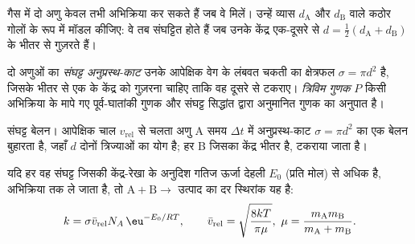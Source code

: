 गैस में दो अणु केवल तभी अभिक्रिया कर सकते हैं जब वे मिलें। उन्हें व्यास $d_{\mathrm A}$ और $d_{\mathrm B}$
वाले कठोर गोलों के रूप में मॉडल कीजिए: वे तब संघट्टित होते हैं जब उनके केंद्र एक-दूसरे से $d =
\frac12(d_{\mathrm A} + d_{\mathrm B})$ के भीतर से गुज़रते हैं।

\begin{definition}[संघट्ट अनुप्रस्थ-काट, त्रिविम गुणक]\label{def:b3:rate-theories:collision}
दो अणुओं का \emph{संघट्ट अनुप्रस्थ-काट}
उनके आपेक्षिक वेग के लंबवत चकती का क्षेत्रफल $\sigma = \pi d^2$ है,
जिसके भीतर से एक के केंद्र को गुज़रना चाहिए ताकि वह दूसरे से टकराए।
\emph{त्रिविम गुणक} $P$ किसी अभिक्रिया के मापे गए
पूर्व-घातांकी गुणक और संघट्ट सिद्धांत द्वारा अनुमानित गुणक का अनुपात है।
\end{definition}

\begin{omfigure}

{\small संघट्ट बेलन। आपेक्षिक चाल $v_{\mathrm{rel}}$ से चलता अणु A
समय $\Delta t$ में अनुप्रस्थ-काट $\sigma = \pi d^2$ का एक बेलन बुहारता है, जहाँ $d$ दोनों
त्रिज्याओं का योग है; हर B जिसका केंद्र भीतर है, टकराया जाता है।}
\end{omfigure}

\begin{theorem}[संघट्ट-सिद्धांत दर स्थिरांक]\label{thm:b3:rate-theories:collision}
यदि हर वह संघट्ट जिसकी केंद्र-रेखा के अनुदिश गतिज ऊर्जा
देहली $E_0$ (प्रति मोल) से अधिक है, अभिक्रिया तक ले जाता है, तो $\mathrm{A + B} \to$
उत्पाद का दर स्थिरांक यह है:
\[
  k = \sigma\bar v_{\mathrm{rel}}N_A\,\eu^{-E_0/RT}, \qquad \bar v_{\mathrm{rel}} = \sqrt{\frac{8kT}{\pi\mu}},\
  \mu = \frac{m_{\mathrm A}m_{\mathrm B}}{m_{\mathrm A} + m_{\mathrm B}} .
\]
\end{theorem}

